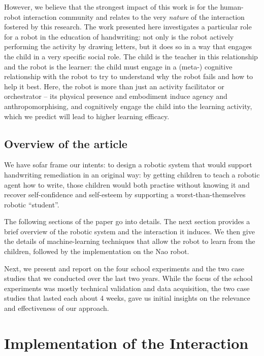 \documentclass{article}
\begin{document}
However, we believe that the strongest impact of this work is for the
human-robot interaction community and relates to the very \emph{nature} of the
interaction fostered by this research. The work presented here investigates a
particular role for a robot in the education of handwriting: not only is the
robot actively performing the activity by drawing letters, but it does so in a
way that engages the child in a very specific social role. The child is the
teacher in this relationship and the robot is the learner: the child must engage
in a (meta-) cognitive relationship with the robot to try to understand why the
robot fails and how to help it best.  Here, the robot is more than just an
activity facilitator or orchestrator -- its physical presence and embodiment
induce agency and anthropomorphising, and cognitively engage the child into the
learning activity, which we predict will lead to higher learning efficacy.


\subsection*{Overview of the article}

We have sofar frame our intents: to design a robotic system that would support
handwriting remediation in an original way: by getting children to teach a
robotic agent how to write, those children would both practise without knowing
it and recover self-confidence and self-esteem by supporting a
worst-than-themselves robotic ``student''.

The following sections of the paper go into details. The next section provides a
brief overview of the robotic system and the interaction it induces. We then
give the details of machine-learning techniques that allow the robot to learn
from the children, followed by the implementation on the Nao robot.

Next, we present and report on the four school experiments and the two case
studies that we conducted over the last two years. While the focus of the school
experiments was mostly technical validation and data acquisition, the two case
studies that lasted each about 4 weeks, gave us initial insights on the
relevance and effectiveness of our approach.

\section{Implementation of the Interaction}
\end{document}
